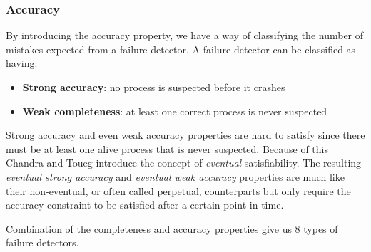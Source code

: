 \documentclass[bsc,frontabs,twoside,singlespacing,parskip,deptreport,hidel]{infthesis}     %
\begin{document}
\subsubsection*{Accuracy}

By introducing the accuracy property, we have a way of classifying the number of mistakes expected from a failure detector. A failure detector can be classified as having: 

\begin{itemize}
  \item \textbf{Strong accuracy}: no process is suspected before it crashes
  \item \textbf{Weak completeness}: at least one correct process is never suspected
\end{itemize}

Strong accuracy and even weak accuracy properties are hard to satisfy since there must be at least one alive process that is never suspected.  Because of this Chandra and Toueg \cite{chandra1996unreliable} introduce the concept of \textit{eventual} satisfiability.  The resulting \textit{eventual strong accuracy} and \textit{eventual weak accuracy} properties are much like their non-eventual, or often called perpetual, counterparts but only require the accuracy constraint to be satisfied after a certain point in time.

Combination of the completeness and accuracy properties give us 8 types of failure detectors.


\end{document}
